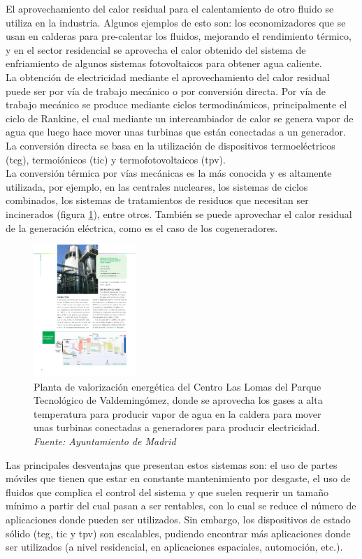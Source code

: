 El aprovechamiento del calor residual para el calentamiento de otro fluido se utiliza en la industria. Algunos ejemplos de esto son: los economizadores que se usan en calderas para pre-calentar los fluidos, mejorando el rendimiento térmico, y en el sector residencial se aprovecha el calor obtenido del sistema de enfriamiento de algunos sistemas fotovoltaicos para obtener agua caliente.\\ 

La obtención de electricidad mediante el aprovechamiento del calor residual puede ser por vía de trabajo mecánico o por conversión directa. Por vía de trabajo mecánico se produce mediante ciclos termodinámicos, principalmente el ciclo de Rankine, el cual mediante un intercambiador de calor se genera vapor de agua que luego hace mover unas turbinas que están conectadas a un generador. La conversión directa se basa en la utilización de dispositivos termoeléctricos (\acrshort{teg}), termoiónicos (\acrshort{tic}) y termofotovoltaicos (\acrshort{tpv}).\\

La conversión térmica por vías mecánicas es la más conocida y es altamente utilizada, por ejemplo, en las centrales nucleares, los sistemas de ciclos combinados, los sistemas de tratamientos de residuos que necesitan ser incinerados (figura \ref{fig:esquemaslomasvalorizacion}), entre otros. También se puede aprovechar el calor residual de la generación eléctrica, como es el caso de los cogeneradores.

\begin{figure}[H]
	\centering
	\includegraphics[height=5cm]{figuras/esquemasLomasValorizacion}
	\caption{Planta de valorización energética del Centro Las Lomas del Parque Tecnológico de Valdemingómez, donde se aprovecha los gases a alta temperatura para producir vapor de agua en la caldera para mover unas turbinas conectadas a generadores para producir electricidad. \textit{Fuente: Ayuntamiento de Madrid}}
	\label{fig:esquemaslomasvalorizacion}
\end{figure}
Las principales desventajas que presentan estos sistemas son: el uso de partes móviles que tienen que estar en constante mantenimiento por desgaste, el uso de fluidos que complica el control del sistema y que suelen requerir un tamaño mínimo a partir del cual pasan a ser rentables, con lo cual se reduce el número de aplicaciones donde pueden ser utilizados. Sin embargo, los dispositivos de estado sólido (\acrshort{teg}, \acrshort{tic} y \acrshort{tpv}) son escalables, pudiendo encontrar más aplicaciones donde ser utilizados (a nivel residencial, en aplicaciones espaciales, automoción, etc.).\\

